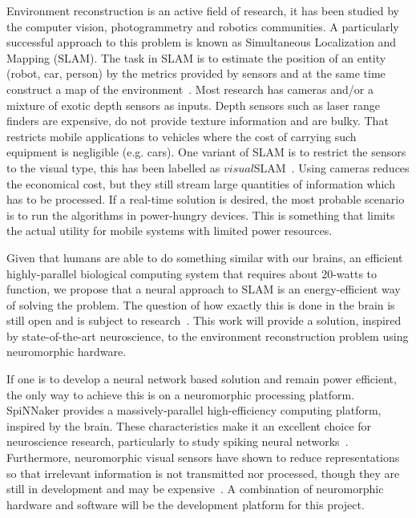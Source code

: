 Environment reconstruction is an active field of research, it has been studied by the computer vision, photogrammetry and robotics communities. A particularly successful approach to this problem is known as Simultaneous Localization and Mapping (SLAM). The task in SLAM is to estimate the position of an entity (robot, car, person) by the metrics provided by sensors and at the same time construct a map of the environment~\cite{Thrun2008_SLAM}. 
Most research has cameras and/or a mixture of exotic depth sensors as inputs.
Depth sensors such as laser range finders are expensive, do not provide texture information and are bulky. That restricts mobile applications to vehicles where the cost of carrying such equipment is negligible (e.g. cars).
One variant of SLAM is to restrict the sensors to the visual type, this has been labelled as $visual$SLAM~\cite{Fuentes-Pacheco2012-slam}. Using cameras reduces the economical cost, but they still stream large quantities of information which has to be processed. If a real-time solution is desired, the most probable scenario is to run the algorithms in power-hungry devices. This is something that limits the actual utility for mobile systems with limited power resources. 

Given that humans are able to do something similar with our brains, an efficient highly-parallel biological computing system that requires about 20-watts to function, we propose that a neural approach to SLAM is an energy-efficient way of solving the problem. The question of how exactly this is done in the brain is still open and is subject to research~\cite{rat-slam}. This work will provide a solution, inspired by state-of-the-art neuroscience, to the environment reconstruction problem using neuromorphic hardware.

If one is to develop a neural network based solution and remain power efficient, the only way to achieve this is on a neuromorphic processing platform. SpiNNaker provides a massively-parallel high-efficiency computing platform, inspired by the brain. These characteristics make it an excellent choice for neuroscience research, particularly to study spiking neural networks~\cite{furber2014spinnaker}. Furthermore, neuromorphic visual sensors have shown to reduce representations so that irrelevant information is not transmitted nor processed, though they are still in development and may be expensive~\cite{aer-retina-bernabe,dvs-zurich}. A combination of neuromorphic hardware and software will be the development platform for this project.
